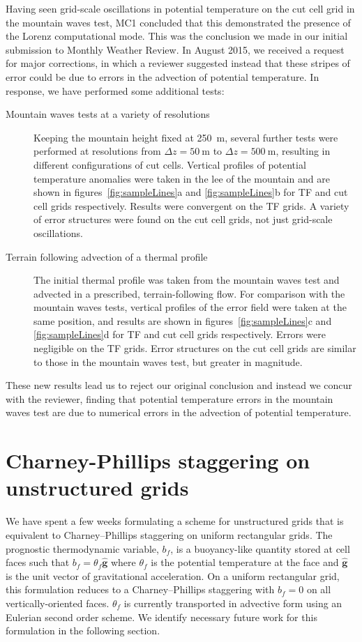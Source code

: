 \documentclass[a4paper]{article}
\begin{document}
Having seen grid-scale oscillations in potential temperature on the cut cell grid in the mountain waves test, MC1 concluded that this demonstrated the presence of the Lorenz computational mode.  This was the conclusion we made in our initial submission to Monthly Weather Review.  In August 2015, we received a request for major corrections, in which a reviewer suggested instead that these stripes of error could be due to errors in the advection of potential temperature.
In response, we have performed some additional tests:
\begin{description}
	\item[Mountain waves tests at a variety of resolutions]{Keeping the mountain height fixed at \SI{250}{\meter}, several further tests were performed at resolutions from $\Delta z = \SI{50}{\meter}$ to $\Delta z = \SI{500}{\meter}$, resulting in different configurations of cut cells.  Vertical profiles of potential temperature anomalies were taken in the lee of the mountain and are shown in figures~\ref{fig:sampleLines}a and \ref{fig:sampleLines}b for TF and cut cell grids respectively.  Results were convergent on the TF grids.  A variety of error structures were found on the cut cell grids, not just grid-scale oscillations.}
	\item[Terrain following advection of a thermal profile]{The initial thermal profile was taken from the mountain waves test and advected in a prescribed, terrain-following flow.  For comparison with the mountain waves tests, vertical profiles of the error field were taken at the same position, and results are shown in figures~\ref{fig:sampleLines}c and \ref{fig:sampleLines}d for TF and cut cell grids respectively.  Errors were negligible on the TF grids.  Error structures on the cut cell grids are similar to those in the mountain waves test, but greater in magnitude.}
\end{description}
These new results lead us to reject our original conclusion and instead we concur with the reviewer, finding that potential temperature errors in the mountain waves test are due to numerical errors in the advection of potential temperature.

\section{Charney-Phillips staggering on unstructured grids}
\label{sec:cp}
We have spent a few weeks formulating a scheme for unstructured grids that is equivalent to Charney--Phillips staggering on uniform rectangular grids.  The prognostic thermodynamic variable, $b_f$, is a buoyancy-like quantity stored at cell faces such that $b_f = \theta_f \bm{\hat{g}}$ where $\theta_f$ is the potential temperature at the face and $\bm{\hat{g}}$ is the unit vector of gravitational acceleration.  On a uniform rectangular grid, this formulation reduces to a Charney--Phillips staggering with $b_f = 0$ on all vertically-oriented faces.  $\theta_f$ is currently transported in advective form using an Eulerian second order scheme.  We identify necessary future work for this formulation in the following section.
\end{document}
